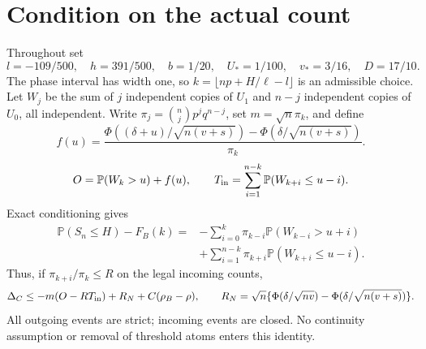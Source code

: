 \documentclass[11pt]{article}
\newcommand{\Pp}{\mathbb P}
\begin{document}
\section{Condition on the actual count}
Throughout set
\[
 l=-109/500,\quad h=391/500,\quad b=1/20,\quad U_*=1/100,
 \quad v_*=3/16,\quad D=17/10.
\]
The phase interval has width one, so
$k=\lfloor np+H/\ell-l\rfloor$ is an admissible choice.
Let $W_j$ be the sum of $j$ independent copies of $U_1$ and $n-j$
independent copies of $U_0$, all independent. Write
$\pi_j=\binom njp^jq^{n-j}$, set $m=\sqrt n\pi_k$, and define
\[
 f(u)=\frac{\Phi((\delta+u)/\sqrt{n(v+s)})-
                  \Phi(\delta/\sqrt{n(v+s)})}{\pi_k}.
\]
\[
 O=\Pp(W_k>u)+f(u),\qquad
 T_{\rm in}=\sum_{i=1}^{n-k}\Pp(W_{k+i}\le u-i).
\]
Exact conditioning gives
\begin{align*}
 \Pp(S_n\le H)-F_B(k)
 ={}&-\sum_{i=0}^k\pi_{k-i}\Pp(W_{k-i}>u+i)\\
 &+\sum_{i=1}^{n-k}\pi_{k+i}\Pp(W_{k+i}\le u-i).
\end{align*}
Thus, if $\pi_{k+i}/\pi_k\le R$ on the legal incoming counts,
\begin{equation}\label{lc:master}
 \Delta_C\le-m(O-RT_{\rm in})+R_N+C(\rho_B-\rho),\qquad
 R_N=\sqrt n\{\Phi(\delta/\sqrt{nv})-
                     \Phi(\delta/\sqrt{n(v+s)})\}.
\end{equation}
All outgoing events are strict; incoming events are closed. No continuity
assumption or removal of threshold atoms enters this identity.
\end{document}
